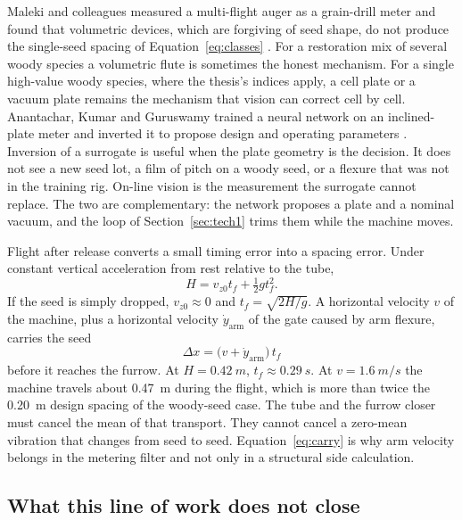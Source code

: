 Maleki and colleagues measured a multi-flight auger as a grain-drill meter and found that volumetric devices, which are forgiving of seed shape, do not produce the single-seed spacing of Equation~\eqref{eq:classes} \cite{maleki2006}. For a restoration mix of several woody species a volumetric flute is sometimes the honest mechanism. For a single high-value woody species, where the thesis's indices apply, a cell plate or a vacuum plate remains the mechanism that vision can correct cell by cell. Anantachar, Kumar and Guruswamy trained a neural network on an inclined-plate meter and inverted it to propose design and operating parameters \cite{anantachar2010}. Inversion of a surrogate is useful when the plate geometry is the decision. It does not see a new seed lot, a film of pitch on a woody seed, or a flexure that was not in the training rig. On-line vision is the measurement the surrogate cannot replace. The two are complementary: the network proposes a plate and a nominal vacuum, and the loop of Section~\ref{sec:tech1} trims them while the machine moves.

Flight after release converts a small timing error into a spacing error. Under constant vertical acceleration from rest relative to the tube,
\begin{equation}
\label{eq:flight}
H = v_{z0} t_f + \tfrac12 g t_f^2.
\end{equation}
If the seed is simply dropped, \(v_{z0}\approx 0\) and \(t_f=\sqrt{2H/g}\). A horizontal velocity \(v\) of the machine, plus a horizontal velocity \(\dot{y}_{\mathrm{arm}}\) of the gate caused by arm flexure, carries the seed
\begin{equation}
\label{eq:carry}
\Delta x = \bigl(v + \dot{y}_{\mathrm{arm}}\bigr)\, t_f
\end{equation}
before it reaches the furrow. At \(H=\SI{0.42}{m}\), \(t_f\approx\SI{0.29}{s}\). At \(v=\SI{1.6}{m/s}\) the machine travels about \SI{0.47}{m} during the flight, which is more than twice the \SI{0.20}{m} design spacing of the woody-seed case. The tube and the furrow closer must cancel the mean of that transport. They cannot cancel a zero-mean vibration that changes from seed to seed. Equation~\eqref{eq:carry} is why arm velocity belongs in the metering filter and not only in a structural side calculation.

\subsection{What this line of work does not close}

